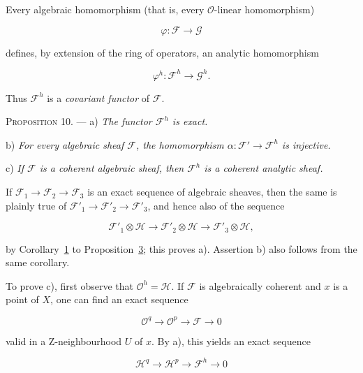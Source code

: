 Every algebraic homomorphism (that is, every $\mathcal{O}$-linear homomorphism)

\begin{equation*}
\varphi:\mathcal{F}\longrightarrow\mathcal{G}
\end{equation*}

defines, by extension of the ring of operators, an analytic homomorphism

\begin{equation*}
\varphi^h:\mathcal{F}^h\longrightarrow\mathcal{G}^h.
\end{equation*}

Thus $\mathcal{F}^h$ is a \emph{covariant functor} of $\mathcal{F}$.

\textsc{Proposition 10}. --- a) \emph{The functor $\mathcal{F}^h$ is exact.}

b) \emph{For every algebraic sheaf $\mathcal{F}$, the homomorphism $\alpha:\mathcal{F}'\to\mathcal{F}^h$ is injective.}

c) \emph{If $\mathcal{F}$ is a coherent algebraic sheaf, then $\mathcal{F}^h$ is a coherent analytic sheaf.}

If $\mathcal{F}_1\to\mathcal{F}_2\to\mathcal{F}_3$ is an exact sequence of algebraic sheaves, then the same is plainly true of $\mathcal{F}'_1\to\mathcal{F}'_2\to\mathcal{F}'_3$, and hence also of the sequence

\begin{equation*}
\mathcal{F}'_1\otimes\mathcal{H}\longrightarrow
\mathcal{F}'_2\otimes\mathcal{H}\longrightarrow
\mathcal{F}'_3\otimes\mathcal{H},
\end{equation*}

by Corollary~\hyperref[gaga:cor:1]{1} to Proposition~\hyperref[gaga:prop:3]{3}; this proves a). Assertion b) also follows from the same corollary.

To prove c), first observe that $\mathcal{O}^h=\mathcal{H}$. If $\mathcal{F}$ is algebraically coherent and $x$ is a point of $X$, one can find an exact sequence

\begin{equation*}
\mathcal{O}^q\longrightarrow\mathcal{O}^p\longrightarrow\mathcal{F}\longrightarrow0
\end{equation*}

valid in a Z-neighbourhood $U$ of $x$. By a), this yields an exact sequence

\begin{equation*}
\mathcal{H}^q\longrightarrow\mathcal{H}^p\longrightarrow\mathcal{F}^h\longrightarrow0
\end{equation*}

